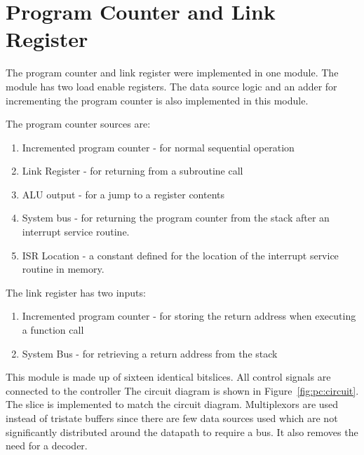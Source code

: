 
\section{Program Counter and Link Register}


The program counter and link register were implemented in one module.
The module has two load enable registers. 
The data source logic and an adder for incrementing the program counter is also implemented in this module.

The program counter sources are:
\begin{enumerate}
\item Incremented program counter - for normal sequential operation
\item Link Register - for returning from a subroutine call
\item ALU output - for a jump to a register contents
\item System bus - for returning the program counter from the stack after an interrupt service routine.
\item ISR Location - a constant defined for the location of the interrupt service routine in memory.
\end{enumerate}

The link register has two inputs:
\begin{enumerate}
\item Incremented program counter - for storing the return address when executing a function call
\item System Bus - for retrieving a return address from the stack 
\end{enumerate}

This module is made up of sixteen identical bitslices. 
All control signals are connected to the controller%
The circuit diagram is shown in Figure~\ref{fig:pc:circuit}.
The slice is implemented to match the circuit diagram. 
Multiplexors are used instead of tristate buffers since there are few data sources used which are not significantly distributed around the datapath to require a bus. 
It also removes the need for a decoder.

